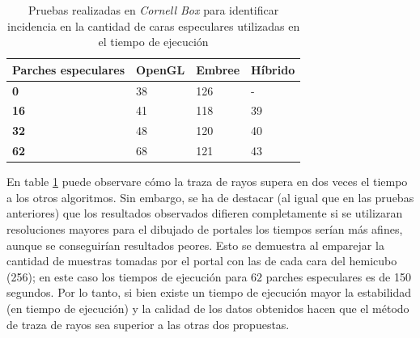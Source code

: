 \begin{table}[H]
	\centering
	\caption{Pruebas realizadas en \textit{Cornell Box} para identificar incidencia en la cantidad de caras especulares utilizadas en el tiempo de ejecución}
\begin{tabular}{|l|l|l|l|}
	\hline
	\multicolumn{1}{|c|}{\textbf{Parches especulares}} & \multicolumn{1}{c|}{OpenGL} & \multicolumn{1}{c|}{Embree} & \multicolumn{1}{c|}{Híbrido} \\ \hline
	\textbf{0}                              & 38                          & 126                         & -                            \\ \hline
	\textbf{16}                             & 41                          & 118                         & 39                           \\ \hline
	\textbf{32}                             & 48                          & 120                         & 40                           \\ \hline
	\textbf{62}                             & 68                          & 121                         & 43                           \\ \hline
\end{tabular}
	\label{tab:caso3}
\end{table}

En table \ref{tab:caso3} puede observare cómo la traza de rayos supera en dos veces el tiempo a los otros algoritmos. Sin embargo, se ha de destacar (al igual que en las pruebas anteriores) que los resultados observados difieren completamente si se utilizaran resoluciones mayores para el dibujado de portales los tiempos serían más afines, aunque se conseguirían resultados peores. Esto se demuestra al emparejar la cantidad de muestras tomadas por el portal con las de cada cara del hemicubo (256); en este caso los tiempos de ejecución para $62$ parches especulares es de 150 segundos. Por lo tanto, si bien existe un tiempo de ejecución mayor la estabilidad (en tiempo de ejecución) y la calidad de los datos obtenidos hacen que el método de traza de rayos sea superior a las otras dos propuestas.

